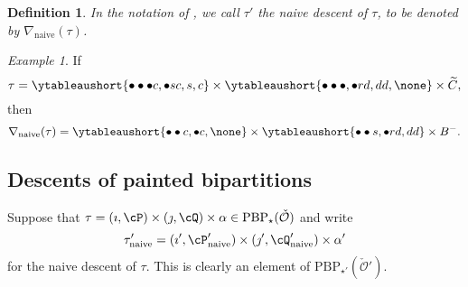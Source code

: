 \documentclass[12pt,a4paper]{amsart}
\newcommand{\CO}{{\mathcal {O}}}
\def\DD{\nabla}
\numberwithin{equation}{section}
\newtheorem{defn}[thm]{Definition}
\theoremstyle{remark}
\newtheorem*{Example}{Example}
\def\DDn{\DD_{\mathrm{naive}}}
\let\ytb=\ytableaushort
\begin{document}
\begin{defn}
 In the notation of , we call $\tau'$ the naive descent of $\tau$, to be denoted by $\DDn(\tau)$.
\end{defn}




 \begin{Example} If
    \[
     \tau = \ytb{\bullet\bullet\bullet {c},\bullet {s} {c},{s},{c}}
    \times \ytb{\bullet\bullet\bullet ,\bullet {r} {d},{d}{d}, \none}
    \times \widetilde C, \]
   then
   \[
    \nabla_{\mathrm{naive}}(\tau) =\ytb{\bullet\bullet{c} ,\bullet{c},\none }
    \times  \ytb{\bullet\bullet {s} ,\bullet {r} {d},{d}{d}}\times B^-.
    \]

\end{Example}

  \subsection{Descents of painted bipartitions}\label{sec:desc}


Suppose that
$
\tau=(\imath,\cP)\times(\jmath,\cQ)\times \alpha \in  \mathrm{PBP}_\star(\check \CO)
$
and write
\[
  \tau'_{\mathrm{naive}}=(\imath', \cP'_{\mathrm{naive}})\times (\jmath', \cQ'_{\mathrm{naive}})\times \alpha'
\]
for the naive descent of $\tau$. This is clearly an element of $  \mathrm{PBP}_{\star'}(\check \CO')$.
\end{document}
